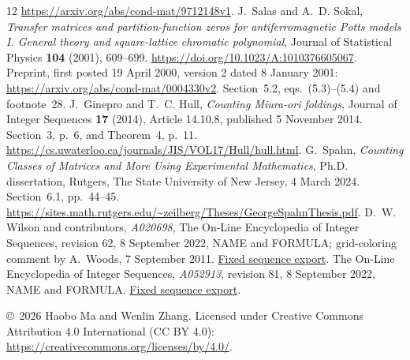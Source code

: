 \documentclass[11pt,a4paper]{article}
\begin{document}
\begin{thebibliography}{12}
\url{https://arxiv.org/abs/cond-mat/9712148v1}.
J.~Salas and A.~D. Sokal, \emph{Transfer matrices and partition-function
zeros for antiferromagnetic Potts models I. General theory and
square-lattice chromatic polynomial}, Journal of Statistical Physics
\textbf{104} (2001), 609--699.
\url{https://doi.org/10.1023/A:1010376605067}.
Preprint, first posted 19 April 2000, version 2 dated 8 January 2001:
\url{https://arxiv.org/abs/cond-mat/0004330v2}.
Section~5.2, eqs.~(5.3)--(5.4) and footnote~28.
J.~Ginepro and T.~C. Hull, \emph{Counting Miura-ori foldings}, Journal
of Integer Sequences \textbf{17} (2014), Article 14.10.8, published
5 November 2014. Section~3, p.~6, and Theorem~4, p.~11.
\url{https://cs.uwaterloo.ca/journals/JIS/VOL17/Hull/hull.html}.
G.~Spahn, \emph{Counting Classes of Matrices and More Using Experimental
Mathematics}, Ph.D. dissertation, Rutgers, The State University of New
Jersey, 4 March 2024. Section~6.1, pp.~44--45.
\url{https://sites.math.rutgers.edu/~zeilberg/Theses/GeorgeSpahnThesis.pdf}.
D.~W. Wilson and contributors, \emph{A020698}, The On-Line Encyclopedia
of Integer Sequences, revision 62, 8 September 2022, NAME and FORMULA;
grid-coloring comment by A.~Woods, 7 September 2011.
\href{https://raw.githubusercontent.com/oeis/oeisdata/571197984aeda7b8b680fe3a1f6a43f9898cd441/seq/A020/A020698.seq}{Fixed sequence export}.
The On-Line Encyclopedia of Integer Sequences, \emph{A052913},
revision 81, 8 September 2022, NAME and FORMULA.
\href{https://raw.githubusercontent.com/oeis/oeisdata/571197984aeda7b8b680fe3a1f6a43f9898cd441/seq/A052/A052913.seq}{Fixed sequence export}.
\end{thebibliography}

\bigskip
\noindent\small \copyright\ 2026 Haobo Ma and Wenlin Zhang.
Licensed under Creative Commons Attribution 4.0 International
(CC BY 4.0): \url{https://creativecommons.org/licenses/by/4.0/}.
\end{document}
